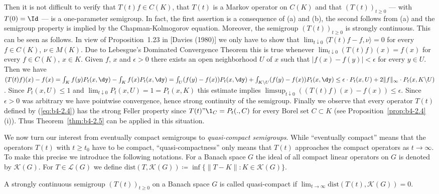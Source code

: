 \begin{example}
	Then it is not difficult to verify that $T(t)f \in C(K)$, that $T(t)$ is
	a Markov operator on $C(K)$ and that $(T(t))_{t \geq 0}$ --- with $T(0) = \Id $ --- is
	a one-parameter semigroup.
	In fact, the first assertion is a consequence of (a) and (b), the second follows from (a) and the semigroup
	property is implied by the Chapman-Kolmogorov equation.
%
%
%
\newpage
Moreover, the semigroup $(T(t))_{t \geq 0}$ is strongly continuous.
This can
be seen as follows. 
In view of Proposition~1.23 in [Davies (1980)] we only have
to show that $\lim_{t\downarrow 0}\langle T(t)f-f,\nu\rangle = 0$ for every $f \in C(K)$, $\nu \in M(K)$.
Due to Lebesgue's Dominated Convergence Theorem this is true whenever
$\lim_{t\downarrow0}(T(t)f)(x) = f(x)$ for every $f \in C(K)$, $x \in K$.
Given $f$, $x$
and $\epsilon > 0$ there exists an open neighborhood $U$ of $x$ such that
$|f(x) - f(y)| < \epsilon$ for every $y \in U$.
Then we have
$(T(t)f)(x) - f(x) = \int_K f(y)P_t(x,\dy) - \int_K f(x)P_t(x,\dy) = 
\int_U (f(y)-f(x))P_t(x,\dy) + \int_{K\backslash U} (f(y)-f(x))P_t(x,\dy) \leq
\epsilon\cdot P_t(x,U) + 2\|f\|_{\infty}\cdot P_t(x,K\backslash U)$.
Since $P_t(x,U) \leq 1$ and $\lim_{t\downarrow0} P_t(x,U) = 1 = P_t(x,K)$ this estimate
implies $\limsup_{t\downarrow0}((T(t)f)(x) - f(x)) \leq \epsilon$.
Since $\epsilon > 0$ was arbitrary we have pointwise convergence, hence strong continuity of the semigroup.
Finally we observe that every operator $T(t)$ defined by (\ref{eq:b4-2.4}) has the
strong Feller property since $T(t)"\1_C = P_t(.,C)$ for every Borel set
$C \subset K$ (see Proposition~\ref{prop:b4-2.4}(i)).
Thus Theorem~\ref{thm:b4-2.5} can be applied in this situation.
\end{example}

We now turn our interest from eventually compact semigroups to \emph{quasi-compact semigroups}.
While \enquote{eventually compact} means that the operators $T(t)$ with $t \geq t_{0}$ have to be compact, \enquote{quasi-compactness} only
means that $T(t)$ approaches the compact operators as $t \to \infty$.
To make this precise we introduce the following notations.
For a Banach space $G$ the ideal of all compact linear operators on $G$ is denoted by $\mathcal{K}(G)$.
For $T \in \mathcal{L}(G)$ we define
$\text{dist}(T,\mathcal{K}(G))  \coloneq  \inf\{\|T - K\| \colon K \in \mathcal{K}(G)\}$.

\begin{definition}\label{def:b4-2.7}
	A strongly continuous semigroup $(T(t))_{t \geq 0}$ on a Banach
	space $G$ is called quasi-compact if $\lim_{t\to\infty}\text{dist}(T(t),\mathcal{K}(G)) = 0$.
\end{definition}

